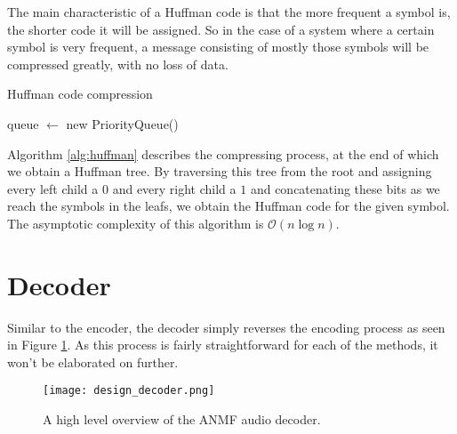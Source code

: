 The main characteristic of a Huffman code is that the more frequent a symbol is, the shorter code it will be assigned. So in the case of a system where a certain symbol is very frequent, a message consisting of mostly those symbols will be compressed greatly, with no loss of data.

\begin{algorithm}[h]
\caption{Huffman code compression}
\label{alg:huffman}
queue $\leftarrow$ new PriorityQueue()\;
\end{algorithm}

Algorithm \ref{alg:huffman} describes the compressing process, at the end of which we obtain a Huffman tree. By traversing this tree from the root and assigning every left child a $0$ and every right child a $1$ and concatenating these bits as we reach the symbols in the leafs, we obtain the Huffman code for the given symbol. The asymptotic complexity of this algorithm is $\mathcal{O}(n \log n)$.

\section{Decoder}
Similar to the encoder, the decoder simply reverses the encoding process as seen in Figure \ref{fig:design_decoder}. As this process is fairly straightforward for each of the methods, it won't be elaborated on further.

\begin{figure}[ht]
	\caption[Decoder overview]{A high level overview of the ANMF audio decoder.}
	\label{fig:design_decoder}
	\centering
	\texttt{[image: design\_decoder.png]}
\end{figure}
